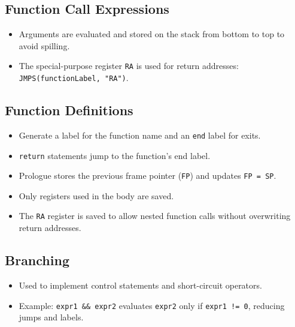 \documentclass[12pt,a4paper]{report}
\begin{document}
\subsection{Function Call Expressions}
\begin{itemize}
    \item Arguments are evaluated and stored on the stack from bottom to top to avoid spilling.  
    \item The special-purpose register \texttt{RA} is used for return addresses: \texttt{JMPS(functionLabel, "RA")}.
\end{itemize}

\subsection{Function Definitions}
\begin{itemize}
    \item Generate a label for the function name and an \texttt{end} label for exits.  
    \item \texttt{return} statements jump to the function’s end label.  
    \item Prologue stores the previous frame pointer (\texttt{FP}) and updates \texttt{FP = SP}.  
    \item Only registers used in the body are saved.  
    \item The \texttt{RA} register is saved to allow nested function calls without overwriting return addresses.
\end{itemize}

\subsection{Branching}
\begin{itemize}
    \item Used to implement control statements and short-circuit operators.  
    \item Example: \texttt{expr1 \&\& expr2} evaluates \texttt{expr2} only if \texttt{expr1 != 0}, reducing jumps and labels.
\end{itemize}
\end{document}
